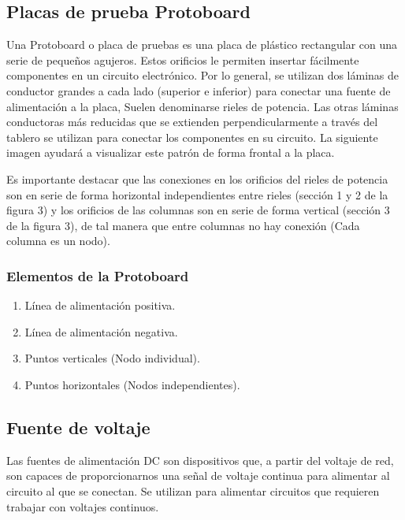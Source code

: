 \documentclass{article}
\begin{document}
    \subsection*{Placas de prueba Protoboard}
    
    Una Protoboard o placa de pruebas es una placa de plástico rectangular con una serie de pequeños agujeros. Estos orificios le permiten insertar fácilmente componentes en un circuito electrónico. Por lo general, se utilizan dos láminas de conductor grandes a cada lado (superior e inferior) para conectar una fuente de alimentación a la placa, Suelen denominarse rieles de potencia. Las otras láminas conductoras más reducidas que se extienden perpendicularmente a través del tablero se utilizan para conectar los componentes en su circuito. La siguiente imagen ayudará a visualizar este patrón de forma frontal a la placa.
    
    Es importante destacar que las conexiones en los orificios del rieles de potencia son en serie de forma horizontal independientes entre rieles (sección 1 y 2 de la figura 3) y los orificios de las columnas son en serie de forma vertical (sección 3 de la figura 3), de tal manera que entre columnas no hay conexión (Cada columna es un nodo).
    
    \subsubsection*{Elementos de la Protoboard}
    
    \begin{enumerate}
        \item Línea de alimentación positiva.
        \item Línea de alimentación negativa.
        \item Puntos verticales (Nodo individual).
        \item Puntos horizontales (Nodos independientes).
    \end{enumerate}



    \subsection*{Fuente de voltaje}
    
    
    Las fuentes de alimentación DC son dispositivos que, a partir del voltaje de red, son capaces de proporcionarnos una señal de voltaje continua para alimentar al circuito al que se conectan. Se utilizan para alimentar circuitos que requieren trabajar con voltajes continuos.
    
\end{document}
